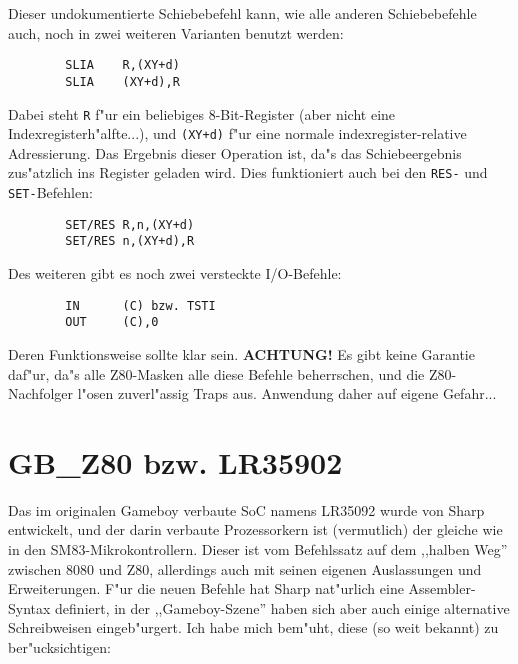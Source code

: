\documentclass[12pt,a4paper,twoside]{report}
\newcommand{\bb}[1]{{\bf #1}}
\newcommand{\tty}[1]{{\tt #1}}
\begin{document}
Dieser undokumentierte Schiebebefehl kann, wie alle anderen
Schiebebefehle auch, noch in zwei weiteren Varianten benutzt
werden:
\begin{verbatim}
        SLIA    R,(XY+d)
        SLIA    (XY+d),R
\end{verbatim}
Dabei steht \tty{R} f"ur ein beliebiges 8-Bit-Register (aber nicht eine
Indexregisterh"alfte...), und \tty{(XY+d)} f"ur eine normale
indexregister-relative Adressierung.  Das Ergebnis dieser Operation
ist, da"s das Schiebeergebnis zus"atzlich ins Register geladen wird.
Dies funktioniert auch bei den \tty{RES-} und \tty{SET-}Befehlen:
\begin{verbatim}
        SET/RES R,n,(XY+d)
        SET/RES n,(XY+d),R
\end{verbatim}
Des weiteren gibt es noch zwei versteckte I/O-Befehle:
\begin{verbatim}
        IN      (C) bzw. TSTI
        OUT     (C),0
\end{verbatim}
Deren Funktionsweise sollte klar sein.  \bb{ACHTUNG!} Es gibt keine
Garantie daf"ur, da"s alle Z80-Masken alle diese Befehle beherrschen,
und die Z80-Nachfolger l"osen zuverl"assig Traps aus.  Anwendung
daher auf eigene Gefahr...


\section{GB\_Z80 bzw. LR35902}

Das im originalen Gameboy verbaute SoC namens LR35092 wurde von Sharp
entwickelt, und der darin verbaute Prozessorkern ist (vermutlich) der gleiche
wie in den SM83-Mikrokontrollern.  Dieser ist vom Befehlssatz auf dem
,,halben Weg'' zwischen 8080 und Z80, allerdings auch mit seinen
eigenen Auslassungen und Erweiterungen.  F"ur die neuen Befehle hat
Sharp nat"urlich eine Assembler-Syntax definiert, in der
,,Gameboy-Szene'' haben sich aber auch einige alternative
Schreibweisen eingeb"urgert.  Ich habe mich bem"uht, diese (so weit
bekannt) zu ber"ucksichtigen:
\end{document}
